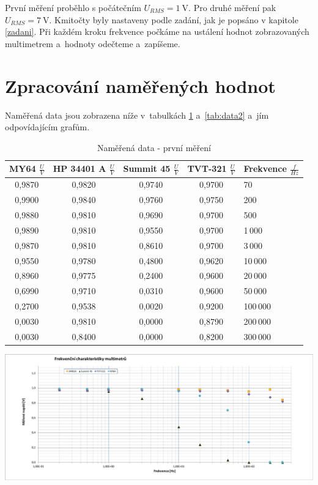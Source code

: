 \documentclass[a4paper,12pt]{article}   %
\begin{document}
První měření proběhlo s počátečním $U_{RMS} = 1~\textrm{V}$. Pro druhé měření pak $U_{RMS} = 7~\textrm{V}$. Kmitočty byly nastaveny podle zadání, jak je popsáno v kapitole \ref{zadani}. Při každém kroku frekvence počkáme na ustálení hodnot zobrazovaných multimetrem a~hodnoty odečteme a~zapíšeme.




\section{Zpracování naměřených hodnot}
Naměřená data jsou zobrazena níže v~tabulkách \ref{tab:data1} a~\ref{tab:data2} a~jím odpovídajícím grafům.

\begin{table}[h!]
    \centering
    \begin{tabular}{|c|c|c|c|l|}
    \hline
    \rule{0pt}{2.5ex}MY64 $\frac{U}{V}$&HP 34401 A	$\frac{U}{V}$&Summit 45 $\frac{U}{V}$   &TVT-321 $\frac{U}{V}$   & Frekvence $\frac{f}{Hz}$\\[.7ex]\hline\hline
    0,9870	& 0,9820	& 0,9740	& 0,9700    & 70\\\hline
    0,9900	& 0,9840	& 0,9760	& 0,9750    & 200\\\hline
    0,9880	& 0,9810	& 0,9690	& 0,9700    & 500\\\hline
    0,9890	& 0,9810	& 0,9550	& 0,9700    & 1\,000\\\hline
    0,9870	& 0,9810	& 0,8610	& 0,9700    & 3\,000\\\hline
    0,9550	& 0,9780	& 0,4800	& 0,9620    & 10\,000\\\hline
    0,8960	& 0,9775	& 0,2400	& 0,9600    & 20\,000\\\hline
    0,6990	& 0,9710	& 0,0310	& 0,9600    & 50\,000\\\hline
    0,2700	& 0,9538	& 0,0020	& 0,9200    & 100\,000\\\hline
    0,0030	& 0,9810	& 0,0000	& 0,8790    & 200\,000\\\hline
    0,0030	& 0,8400	& 0,0000	& 0,8200    & 300\,000\\\hline
    \end{tabular}
    \caption{Naměřená data - první měření} 
    \label{tab:data1}
\end{table}

\begin{graf}
    \centering
    \includegraphics[width=.9\textwidth]{graf1.pdf}
    \caption{Hodnoty z prvního měření}
    \label{graf1}
\end{graf}
\end{document}
